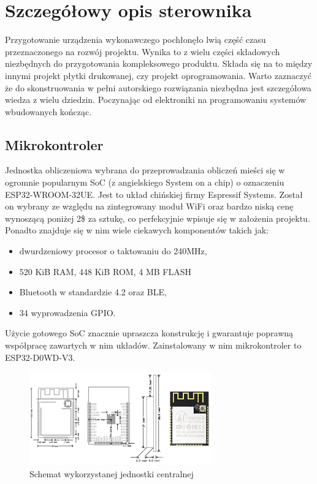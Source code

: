 
    \chapter{Szczegółowy opis sterownika}
        Przygotowanie urządzenia wykonawczego pochłonęło lwią część czasu przeznaczonego na rozwój projektu. Wynika to z wielu części składowych niezbędnych do przygotowania kompleksowego produktu. Składa się na to między innymi projekt płytki drukowanej, czy projekt oprogramowania. Warto zaznaczyć że do skonstruowania w pełni autorskiego rozwiązania niezbędna jest szczegółowa wiedza z wielu dziedzin. Poczynając od elektroniki na programowaniu systemów wbudowanych kończąc.
    
    
        \section{Mikrokontroler}
            Jednostka obliczeniowa wybrana do przeprowadzania obliczeń mieści się w ogromnie popularnym SoC (z angielskiego System on a chip) o oznaczeniu ESP32-WROOM-32UE. Jest to układ chińskiej firmy Espressif Systems. Został on wybrany ze względu na zintegrowany moduł WiFi oraz bardzo niską cenę wynoszącą poniżej 2\$ za sztukę, co perfekcyjnie wpisuje się w założenia projektu. Ponadto znajduje się w nim wiele ciekawych komponentów takich jak:
    
            \begin{itemize}
              \item dwurdzeniowy procesor o taktowaniu do 240MHz,
              \item 520 KiB RAM, 448 KiB ROM, 4 MB FLASH
              \item Bluetooth w standardzie 4.2 oraz BLE,
              \item 34 wyprowadzenia GPIO.
            \end{itemize}
            
            Użycie gotowego SoC znacznie upraszcza konstrukcję i gwarantuje poprawną współpracę zawartych w nim układów. Zainstalowany w nim mikrokontroler to ESP32-D0WD-V3. 
    
    
            \begin{figure}[ht]
              \centering
              \includegraphics[width=0.7\textwidth]{img/esp32.jpg}
              \caption{Schemat wykorzystanej jednostki centralnej}
              \label{esp}
            \end{figure}
    
